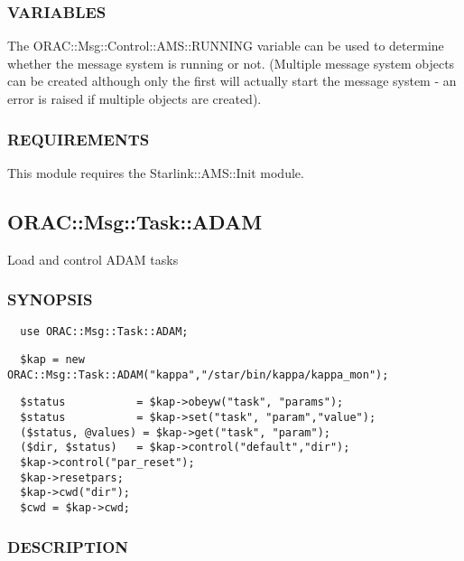 \subsubsection*{VARIABLES\label{ORAC::Msg::Control::AMS_VARIABLES}}

The ORAC::Msg::Control::AMS::RUNNING variable can be 
used to determine whether the message system is running or not.
(Multiple message system objects can be created although only
the first will actually start the message system - an error is raised
if multiple objects are created).

\subsubsection*{REQUIREMENTS\label{ORAC::Msg::Control::AMS_REQUIREMENTS}}

This module requires the Starlink::AMS::Init module.



\subsection{ORAC::Msg::Task::ADAM\label{ORAC::Msg::Task::ADAM}}

Load and control ADAM tasks

\subsubsection*{SYNOPSIS\label{ORAC::Msg::Task::ADAM_SYNOPSIS}}\begin{verbatim}
  use ORAC::Msg::Task::ADAM;
\end{verbatim}
\begin{verbatim}
  $kap = new ORAC::Msg::Task::ADAM("kappa","/star/bin/kappa/kappa_mon");
\end{verbatim}
\begin{verbatim}
  $status           = $kap->obeyw("task", "params");
  $status           = $kap->set("task", "param","value");
  ($status, @values) = $kap->get("task", "param");
  ($dir, $status)   = $kap->control("default","dir");
  $kap->control("par_reset");
  $kap->resetpars;
  $kap->cwd("dir");
  $cwd = $kap->cwd;
\end{verbatim}
\subsubsection*{DESCRIPTION\label{ORAC::Msg::Task::ADAM_DESCRIPTION}}

